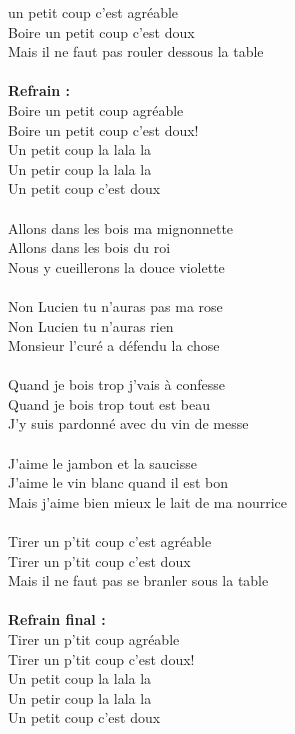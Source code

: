 
 un petit coup c'est agréable
\\Boire un petit coup c'est doux
\\Mais il ne faut pas rouler dessous la table
\\\\\textbf{Refrain :}
\\Boire un petit coup agréable
\\Boire un petit coup c'est doux!
\\Un petit coup la lala la
\\Un petir coup la lala la
\\Un petit coup c'est doux
\\\\Allons dans les bois ma mignonnette
\\Allons dans les bois du roi
\\Nous y cueillerons la douce violette
\\\\Non Lucien tu n'auras pas ma rose
\\Non Lucien tu n'auras rien
\\Monsieur l'curé a défendu la chose
\\\\Quand je bois trop j'vais à confesse
\\Quand je bois trop tout est beau
\\J'y suis pardonné avec du vin de messe
\\\\J'aime le jambon et la saucisse
\\J'aime le vin blanc quand il est bon
\\Mais j'aime bien mieux le lait de ma nourrice
\\\\Tirer un p'tit coup c'est agréable
\\Tirer un p'tit coup c'est doux
\\Mais il ne faut pas se branler sous la table
\\\\\textbf{Refrain final :}
\\Tirer un p'tit coup agréable
\\Tirer un p'tit coup c'est doux!
\\Un petit coup la lala la
\\Un petir coup la lala la
\\Un petit coup c'est doux

\breakpage